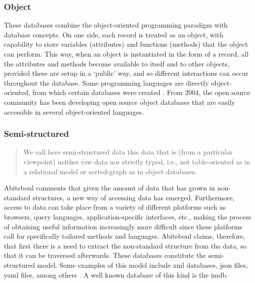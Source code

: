 \subsubsection{Object}
\label{model:object}


These databases combine the object-oriented programming paradigm with database concepts. On one side, each record is treated as an object, with capability to store variables (attributes) and functions (methods) that the object can perform. This way, when an object is instantiated in the form of a record, all the attributes and methods become available to itself and to other objects, provided these are setup in a `public' way, and so different interactions can occur throughout the database. Some programming languages are directly object-oriented, from which certain databases were created . From 2004, the open source community has been developing open source object databases that are easily accessible in several object-oriented languages.

\subsubsection{Semi-structured}
\label{model:semistructured}


\begin{quote}
	We call here semi-structured data this data that is (from a particular viewpoint) neither raw data nor strictly typed, i.e., not table-oriented as in a relational model or sorted-graph as in object databases. \parencite{Abiteboul:semistructured:96}
\end{quote}

Abiteboul \parencite{Abiteboul:semistructured:96} comments that given the amount of data that has grown in non-standard structures, a new way of accessing data has emerged. Furthermore, access to data can take place from a variety of different platforms such as browsers, query languages, application-specific interfaces, etc., making the process of obtaining useful information increasingly more difficult since these platforms call for specifically tailored methods and languages. Abiteboul claims, therefore, that first there is a need to extract the non-standard structure from the data, so that it can be traversed afterwards. These databases constitute the semi-structured model. Some examples of this model include \gls{xml} databases, \gls{json} files, \gls{yaml} files, among others \parencite{Buneman:1997:SD:263661.263675}. A well known database of this kind is the \gls{imdb}.


